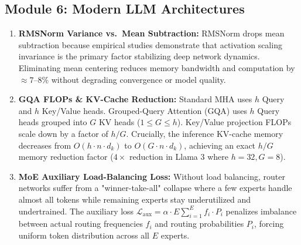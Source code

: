 \documentclass[11pt,a4paper]{article}
\begin{document}
	\subsection*{Module 6: Modern LLM Architectures}
	\begin{enumerate}
		\item \textbf{RMSNorm Variance vs.\ Mean Subtraction:} RMSNorm drops mean subtraction because empirical studies \parencite{zhang2019rmsnorm} demonstrate that activation scaling invariance is the primary factor stabilizing deep network dynamics. Eliminating mean centering reduces memory bandwidth and computation by $\approx 7$--$8\%$ without degrading convergence or model quality.
		\item \textbf{GQA FLOPs \& KV-Cache Reduction:} Standard MHA uses $h$ Query and $h$ Key/Value heads. Grouped-Query Attention (GQA) uses $h$ Query heads grouped into $G$ KV heads ($1 \le G \le h$). Key/Value projection FLOPs scale down by a factor of $h/G$. Crucially, the inference KV-cache memory decreases from $O(h \cdot n \cdot d_k)$ to $O(G \cdot n \cdot d_k)$, achieving an exact $h/G$ memory reduction factor ($4\times$ reduction in Llama 3 where $h=32, G=8$).
		\item \textbf{MoE Auxiliary Load-Balancing Loss:} Without load balancing, router networks suffer from a "winner-take-all" collapse where a few experts handle almost all tokens while remaining experts stay underutilized and undertrained. The auxiliary loss $\mathcal{L}_{\mathrm{aux}} = \alpha \cdot E \sum_{i=1}^{E} f_i \cdot P_i$ penalizes imbalance between actual routing frequencies $f_i$ and routing probabilities $P_i$, forcing uniform token distribution across all $E$ experts.
	\end{enumerate}
\end{document}
